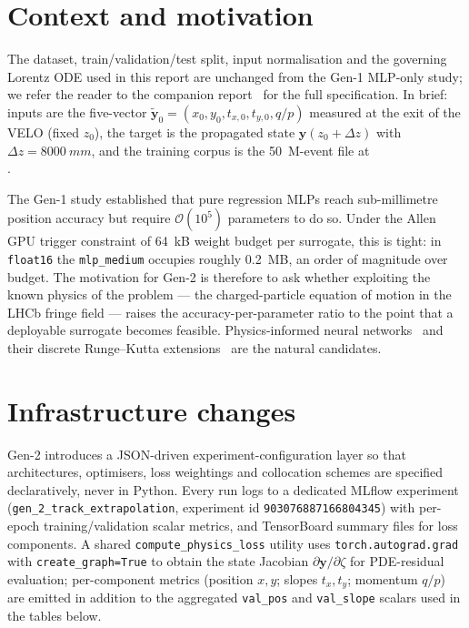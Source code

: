 \documentclass[a4paper,11pt]{article}
\newcommand{\SI}[2]{#1~#2}
\newcommand{\qop}{q/p}
\newcommand{\dz}{\Delta z}
\newcommand{\state}{\mathbf{y}}
\begin{document}
\section{Context and motivation}\label{gen2old:sec:context}

The dataset, train/validation/test split, input normalisation and the
governing Lorentz ODE used in this report are unchanged from the Gen-1
MLP-only study; we refer the reader to the companion report~\cite{gen1report}
for the full specification. In brief: inputs are the five-vector
$\tilde{\state}_0 = (x_0,y_0,t_{x,0},t_{y,0},\qop)$ measured at the exit of
the VELO (fixed $z_0$), the target is the propagated state $\state(z_0+\dz)$
with $\dz=\SI{8000}{mm}$, and the training corpus is the \SI{50}{M}-event
file at\\ .

The Gen-1 study established that pure regression MLPs reach sub-millimetre
position accuracy but require $\mathcal{O}(10^{5})$ parameters to do so. Under
the Allen~\cite{allen2020} GPU trigger constraint of \SI{64}{kB} weight
budget per surrogate, this is tight: in \texttt{float16} the
\texttt{mlp\_medium} occupies roughly \SI{0.2}{MB}, an order of magnitude over
budget. The motivation for Gen-2 is therefore to ask whether exploiting the
known physics of the problem --- the charged-particle equation of motion in
the LHCb fringe field --- raises the accuracy-per-parameter ratio to the point
that a deployable surrogate becomes feasible. Physics-informed neural
networks~\cite{raissi2019,karniadakis2021} and their discrete Runge--Kutta
extensions~\cite{stiasny2021} are the natural candidates.

\section{Infrastructure changes}\label{gen2old:sec:infra}

Gen-2 introduces a JSON-driven experiment-configuration layer so that
architectures, optimisers, loss weightings and collocation schemes are
specified declaratively, never in Python. Every run logs to a dedicated
MLflow experiment (\texttt{gen\_2\_track\_extrapolation}, experiment id
\texttt{903076887166804345}) with per-epoch training/validation scalar
metrics, and TensorBoard summary files for loss components. A shared
\texttt{compute\_physics\_loss} utility uses \texttt{torch.autograd.grad}
with \texttt{create\_graph=True} to obtain the state Jacobian
$\partial\state/\partial\zeta$ for PDE-residual evaluation; per-component
metrics (position $x,y$; slopes $t_x,t_y$; momentum $\qop$) are emitted in
addition to the aggregated \texttt{val\_pos} and \texttt{val\_slope} scalars
used in the tables below.
\end{document}
